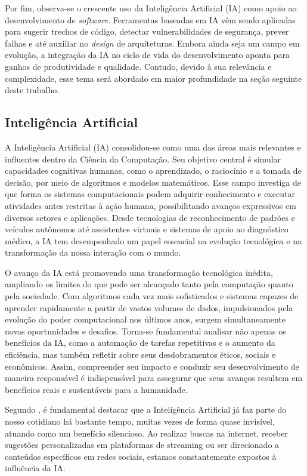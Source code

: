 \documentclass[english,brazilian]{UNISINOSartigo} %
\begin{document}
Por fim, observa-se o crescente uso da Inteligência Artificial (IA) como apoio ao desenvolvimento de \textit{software}. Ferramentas baseadas em IA vêm sendo aplicadas para sugerir trechos de código, detectar vulnerabilidades de segurança, prever falhas e até auxiliar no \textit{design} de arquiteturas. Embora ainda seja um campo em evolução, a integração da IA no ciclo de vida do desenvolvimento aponta para ganhos de produtividade e qualidade. Contudo, devido à sua relevância e complexidade, esse tema será abordado em maior profundidade na seção seguinte deste trabalho.

\subsection{Inteligência Artificial}

A Inteligência Artificial (IA) consolidou-se como uma das áreas mais relevantes e influentes dentro da Ciência da Computação. Seu objetivo central é simular capacidades cognitivas humanas, como o aprendizado, o raciocínio e a tomada de decisão, por meio de algoritmos e modelos matemáticos. Esse campo investiga de que forma os sistemas computacionais podem adquirir conhecimento e executar atividades antes restritas à ação humana, possibilitando avanços expressivos em diversos setores e aplicações. Desde tecnologias de reconhecimento de padrões e veículos autônomos até assistentes virtuais e sistemas de apoio ao diagnóstico médico, a IA tem desempenhado um papel essencial na evolução tecnológica e na transformação da nossa interação com o mundo.

O avanço da IA está promovendo uma transformação tecnológica inédita, ampliando os limites do que pode ser alcançado tanto pela computação quanto pela sociedade. Com algoritmos cada vez mais sofisticados e sistemas capazes de aprender rapidamente a partir de vastos volumes de dados, impulsionados pela evolução do poder computacional nos últimos anos, surgem simultaneamente novas oportunidades e desafios. Torna-se fundamental analisar não apenas os benefícios da IA, como a automação de tarefas repetitivas e o aumento da eficiência, mas também refletir sobre seus desdobramentos éticos, sociais e econômicos. Assim, compreender seu impacto e conduzir seu desenvolvimento de maneira responsável é indispensável para assegurar que seus avanços resultem em benefícios reais e sustentáveis para a humanidade.

Segundo , é fundamental destacar que a Inteligência Artificial já faz parte do nosso cotidiano há bastante tempo, muitas vezes de forma quase invisível, atuando como um benefício silencioso. Ao realizar buscas na internet, receber sugestões personalizadas em plataformas de streaming ou ser direcionado a conteúdos específicos em redes sociais, estamos constantemente expostos à influência da IA.
\end{document}
